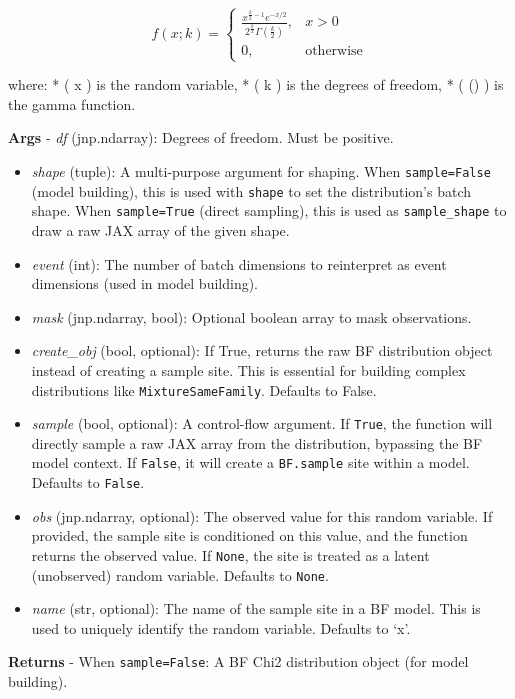 \documentclass[
  letterpaper,
  DIV=11,
  numbers=noendperiod]{scrartcl}
\begin{document}
\[   
f(x; k) = \begin{cases}
\frac{x^{\frac{k}{2} - 1} e^{-x/2}}{2^{\frac{k}{2}} \Gamma\left(\frac{k}{2}\right)}, & x > 0 \\
0, & \text{otherwise}
\end{cases}
\]

where: * ( x ) is the random variable, * ( k ) is the degrees of
freedom, * ( \Gamma(\cdot) ) is the gamma function.

\textbf{Args} - \emph{df} (jnp.ndarray): Degrees of freedom. Must be
positive.

\begin{itemize}
\item
  \emph{shape} (tuple): A multi-purpose argument for shaping. When
  \texttt{sample=False} (model building), this is used with
  \texttt{shape} to set the distribution's batch shape. When
  \texttt{sample=True} (direct sampling), this is used as
  \texttt{sample\_shape} to draw a raw JAX array of the given shape.
\item
  \emph{event} (int): The number of batch dimensions to reinterpret as
  event dimensions (used in model building).
\item
  \emph{mask} (jnp.ndarray, bool): Optional boolean array to mask
  observations.
\item
  \emph{create\_obj} (bool, optional): If True, returns the raw BF
  distribution object instead of creating a sample site. This is
  essential for building complex distributions like
  \texttt{MixtureSameFamily}. Defaults to False.
\item
  \emph{sample} (bool, optional): A control-flow argument. If
  \texttt{True}, the function will directly sample a raw JAX array from
  the distribution, bypassing the BF model context. If \texttt{False},
  it will create a \texttt{BF.sample} site within a model. Defaults to
  \texttt{False}.
\item
  \emph{obs} (jnp.ndarray, optional): The observed value for this random
  variable. If provided, the sample site is conditioned on this value,
  and the function returns the observed value. If \texttt{None}, the
  site is treated as a latent (unobserved) random variable. Defaults to
  \texttt{None}.
\item
  \emph{name} (str, optional): The name of the sample site in a BF
  model. This is used to uniquely identify the random variable. Defaults
  to `x'.
\end{itemize}

\textbf{Returns} - When \texttt{sample=False}: A BF Chi2 distribution
object (for model building).
\end{document}
